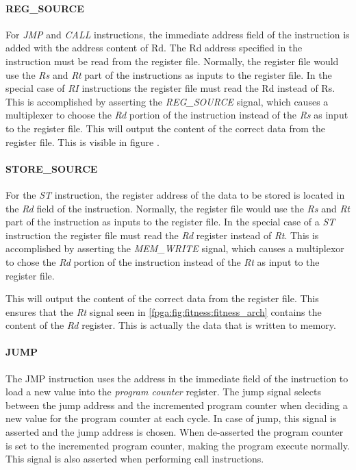 \paragraph{REG\_SOURCE}
For \emph{JMP} and \emph{CALL} instructions, the immediate address field of the instruction is added with the address content of Rd.
The Rd address specified in the instruction must be read from the register file.
Normally, the register file would use the \emph{Rs} and \emph{Rt} part of the instructions as inputs to the register file.
In the special case of \emph{RI} instructions the register file must read the Rd instead of Rs.
This is accomplished by asserting the \emph{REG\_SOURCE} signal, which causes a multiplexer to choose the \emph{Rd} portion of the instruction instead of the \emph{Rs} as input to the register file.
This will output the content of the correct data from the register file.
This is visible in figure .


\paragraph{STORE\_SOURCE}
For the \emph{ST} instruction, the register address of the data to be stored is located in the \emph{Rd} field of the instruction.  Normally, the register file would use the \emph{Rs} and \emph{Rt} part of the instruction as inputs to the register file. In the special case of a \emph{ST} instruction the register file must read the \emph{Rd} register instead of \emph{Rt}. This is accomplished by asserting the \emph{MEM\_WRITE} signal, which causes a multiplexor to chose the \emph{Rd} portion of the instruction instead of the \emph{Rt} as input to the register file. 

This will output the content of the correct data from the register file. This ensures that the \emph{Rt} signal seen in \ref{fpga:fig:fitness:fitness_arch} contains the content of the \emph{Rd} register. This is actually the data that is written to memory.





\paragraph{JUMP}
The JMP instruction uses the address in the immediate field of the instruction to load a new value into the \emph{program counter} register.
The jump signal selects between the jump address and the incremented program counter when deciding a new value for the program counter at each cycle.
In case of jump, this signal is asserted and the jump address is chosen.
When de-asserted the program counter is set to the incremented program counter, making the program execute normally.
This signal is also asserted when performing call instructions.   

